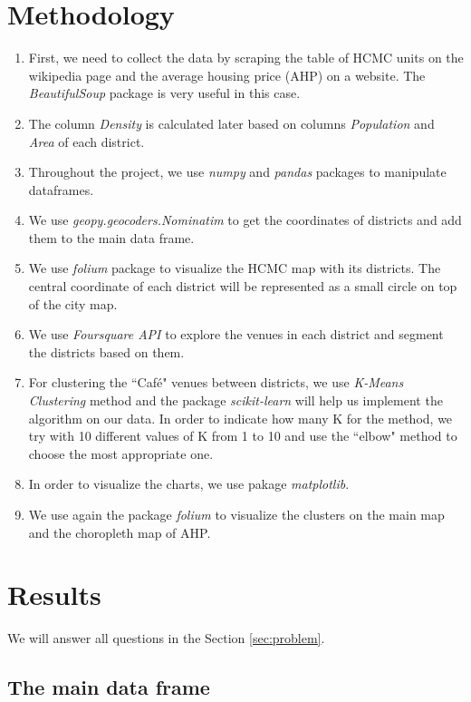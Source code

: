 \documentclass[12pt,a4paper]{article}
\begin{document}
\section{Methodology}

\begin{enumerate}
\item First, we need to collect the data by scraping the table of HCMC units on the wikipedia page and the average housing price (AHP) on a website. The \textit{BeautifulSoup} package is very useful in this case.
\item The column \textit{Density} is calculated later based on columns \textit{Population} and \textit{Area} of each district.
\item Throughout the project, we use \textit{numpy} and \textit{pandas} packages to manipulate dataframes.
\item We use \textit{geopy.geocoders.Nominatim} to get the coordinates of districts and add them to the main data frame.
\item We use \textit{folium} package to visualize the HCMC map with its districts. The central coordinate of each district will be represented as a small circle on top of the city map.
\item We use \textit{Foursquare API} to explore the venues in each district and segment the districts based on them.
\item For clustering the ``Café" venues between districts, we use \textit{K-Means Clustering} method and the package \textit{scikit-learn} will help us implement the algorithm on our data. In order to indicate how many K for the method, we try with 10 different values of K from 1 to 10 and use the ``elbow" method to choose the most appropriate one.
\item In order to visualize the charts, we use pakage \textit{matplotlib}.
\item We use again the package \textit{folium} to visualize the clusters on the main map and the choropleth map of AHP.
\end{enumerate}

\section{Results}

We will answer all questions in the Section \ref{sec:problem}.

\subsection{The main data frame}
\end{document}
